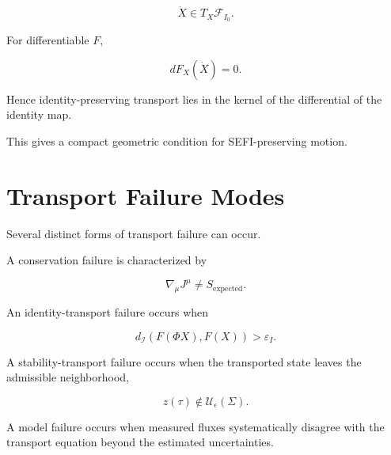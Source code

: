 \documentclass[12pt,oneside]{book}
\begin{document}
\begin{equation}
    \dot{X}
    \in
    T_X\mathcal{F}_{I_0}.
    \label{eq:transport-tangent-identity-fiber}
\end{equation}

For differentiable \(F\),

\begin{equation}
    dF_X(\dot{X})
    =
    0.
    \label{eq:kernel-identity-transport}
\end{equation}

Hence identity-preserving transport lies in the kernel of the
differential of the identity map.

This gives a compact geometric condition for SEFI-preserving
motion.


\section{Transport Failure Modes}
\label{sec:transport-failure}

Several distinct forms of transport failure can occur.

A conservation failure is characterized by

\begin{equation}
    \nabla_\mu J^\mu
    \neq
    S_{\mathrm{expected}}.
    \label{eq:conservation-failure}
\end{equation}

An identity-transport failure occurs when

\begin{equation}
    d_{\mathcal{I}}
    \left(
        F(\Phi X),
        F(X)
    \right)
    >
    \varepsilon_I.
    \label{eq:identity-transport-failure}
\end{equation}

A stability-transport failure occurs when the transported state
leaves the admissible neighborhood,

\begin{equation}
    z(\tau)
    \notin
    \mathcal{U}_{\epsilon}(\Sigma).
    \label{eq:stability-transport-failure}
\end{equation}

A model failure occurs when measured fluxes systematically
disagree with the transport equation beyond the estimated
uncertainties.
\end{document}
